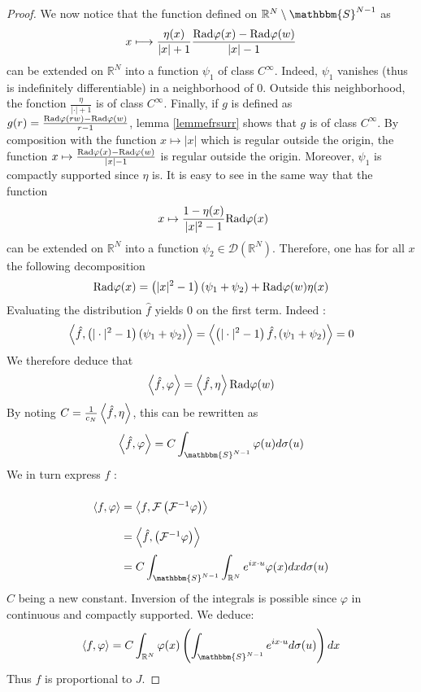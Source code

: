 \documentclass[11pt,a4paper]{article}
\begin{document}
\begin{The}
\begin{proof}
We now notice that the function defined on $\mathbb{R}^N \setminus \mathbbm{S}^{N-1}$ as \[x\longmapsto \frac{\eta(x)}{|x|+1}\frac{\textup{Rad}\varphi(x) - \textup{Rad}\varphi(w)}{|x| - 1}\] can be extended on $\mathbb{R}^N$ into a  function $\psi_1$ of class $C^\infty$. Indeed, $\psi_1$ vanishes (thus is indefinitely differentiable) in a neighborhood of $0$. Outside this neighborhood, the fonction $\frac{\eta}{|\cdot|+1}$ is of class $C^\infty$. Finally, if $g$ is defined as $g(r) =\frac{\textup{Rad}\varphi(rw) - \textup{Rad}\varphi(w)}{r - 1}$, lemma  \ref{lemmefrsurr} shows that $g$ is of class $C^\infty$. By composition with the function $x \mapsto |x|$ which is regular outside the origin, the function $x\mapsto\frac{\textup{Rad}\varphi(x) - \textup{Rad}\varphi(w)}{|x| - 1}$ is regular outside the origin. Moreover, $\psi_1$ is compactly supported since $\eta$ is. It is easy to see in the same way that the function \[\ x \mapsto \frac{1-\eta(x)}{|x|^2 - 1}\textup{Rad}\varphi(x)\] can be extended on $\mathbb{R}^N$ into a function $\psi_2 \in \mathcal{D}(\mathbb{R}^N)$. Therefore, one has for all $x$ the following decomposition \[\textup{Rad}\varphi(x) = \left(|x|^2 - 1\right)(\psi_1 + \psi_2) + \textup{Rad}\varphi(w)\eta(x)\] Evaluating the distribution $\hat{f}$ yields $0$ on the first term. Indeed : \[\left\langle \hat{f},\left(|\cdot|^2-1\right)\left(\psi_1 + \psi_2\right)\right\rangle = \left\langle \left(|\cdot|^2-1\right)\hat{f},\left(\psi_1 + \psi_2\right)\right\rangle = 0 \] We therefore deduce that \[\left\langle \hat{f},\varphi\right\rangle = \left\langle \hat{f},\eta\right\rangle\textup{Rad}\varphi(w)\] By noting $C = \frac{1}{c_N}\left\langle \hat{f},\eta\right\rangle$, this can be rewritten as \[\duality{\hat{f}}{\varphi} = C \int_{\mathbbm{S}^{N-1}}{\varphi(u)d\sigma(u)}\] 
We in turn express $f$ : 
\[\arraycolsep=1.4pt\def\arraystretch{2.2}
\begin{array}{ll}
\duality{f}{\varphi} &= \duality{f}{\mathcal{F}\left(\mathcal{F}^{-1}\varphi\right)}\\
&= \duality{\hat{f}}{\left(\mathcal{F}^{-1}\varphi\right)}\\
&= \displaystyle C\int_{\mathbbm{S}^{N-1}}\int_{\mathbb{R}^N}e^{ix \cdot u}\varphi(x)dxd\sigma(u)
\end{array}
\]
$C$ being a new constant. Inversion of the integrals is possible since $\varphi$ in continuous and compactly supported. We deduce:  \[\duality{f}{\varphi} = C\int_{\mathbb{R}^N}\varphi(x) \left( \int_{\mathbbm{S}^{N-1}}e^{ix\cdot u}d\sigma(u)\right) dx\]
Thus $f$ is proportional to $J$. 
\end{proof}
\end{The}
\end{document}
